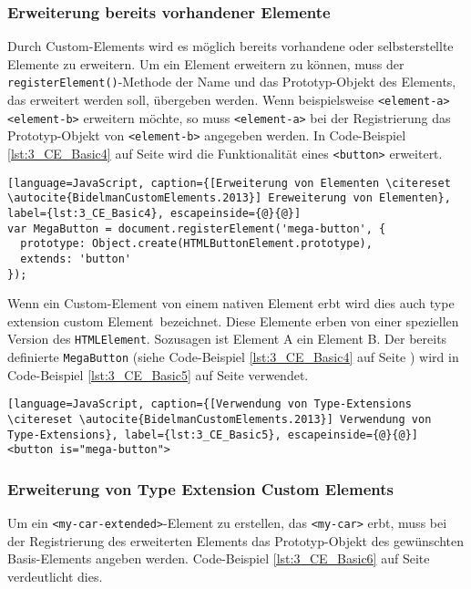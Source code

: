 \subsubsection{Erweiterung bereits vorhandener Elemente}

Durch Custom-Elements wird es möglich bereits vorhandene oder selbsterstellte Elemente zu erweitern. Um ein Element erweitern zu können, muss der \lstinline|registerElement()|-Methode der Name und das Prototyp-Objekt des Elements, das erweitert werden soll, übergeben werden. Wenn beispielsweise \lstinline|<element-a>| \lstinline|<element-b>| erweitern möchte, so muss \lstinline|<element-a>| bei der Registrierung das Prototyp-Objekt von \lstinline|<element-b>| angegeben werden. In Code-Beispiel \ref{lst:3_CE_Basic4} auf Seite \pageref{lst:3_CE_Basic4} wird die Funktionalität eines \lstinline|<button>| erweitert.

\begin{lstlisting}[language=JavaScript, caption={[Erweiterung von Elementen \citereset \autocite{BidelmanCustomElements.2013}] Ereweiterung von Elementen}, label={lst:3_CE_Basic4}, escapeinside={@}{@}]
var MegaButton = document.registerElement('mega-button', {
  prototype: Object.create(HTMLButtonElement.prototype),
  extends: 'button'
});
\end{lstlisting}

Wenn ein Custom-Element von einem nativen Element erbt wird dies auch \glqq type extension custom Element\grqq\ bezeichnet. Diese Elemente erben von einer speziellen Version des \lstinline|HTMLElement|. Sozusagen \glqq ist Element A ein Element B\grqq . Der bereits definierte \lstinline|MegaButton| (siehe Code-Beispiel \ref{lst:3_CE_Basic4} auf Seite \pageref{lst:3_CE_Basic4}) wird in Code-Beispiel \ref{lst:3_CE_Basic5} auf Seite \pageref{lst:3_CE_Basic5} verwendet.

\begin{lstlisting}[language=JavaScript, caption={[Verwendung von Type-Extensions \citereset \autocite{BidelmanCustomElements.2013}] Verwendung von Type-Extensions}, label={lst:3_CE_Basic5}, escapeinside={@}{@}]
<button is="mega-button">
\end{lstlisting}

\subsubsection{Erweiterung von Type Extension Custom Elements}

Um ein \lstinline|<my-car-extended>|-Element zu erstellen, das \lstinline|<my-car>| erbt, muss bei der Registrierung des erweiterten Elements das Prototyp-Objekt des gewünschten \glqq Basis\grqq -Elements angeben werden. Code-Beispiel \ref{lst:3_CE_Basic6} auf Seite \pageref{lst:3_CE_Basic6} verdeutlicht dies.

